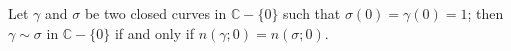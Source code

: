 Let $\gamma$ and $\sigma$ be two closed curves in $\mathbb{C} - \{0\}$ such that $\sigma(0) = \gamma(0) = 1$; then $\gamma \sim \sigma$ in $\mathbb{C} - \{0\}$ if and only if $n(\gamma; 0) = n(\sigma; 0)$.

